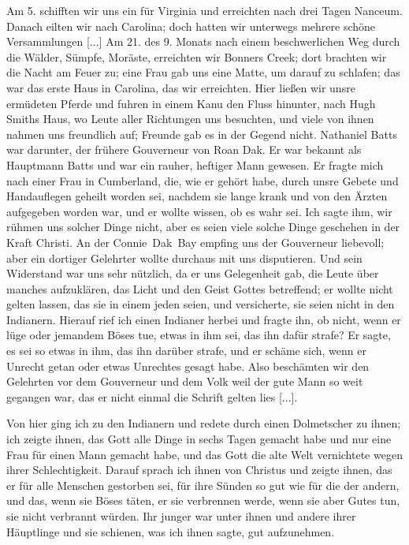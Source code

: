 Am 5. schifften wir uns ein für Virginia und erreichten nach
drei Tagen Nanceum. Danach eilten wir 
nach Carolina; doch
hatten wir unterwegs mehrere schöne Versammlungen [...] Am
21. des 9. Monats nach einem beschwerlichen Weg durch die
Wälder, Sümpfe, Moräste, erreichten wir 
Bonners Creek; dort
brachten wir die Nacht am Feuer zu; eine Frau gab uns eine
Matte, um darauf zu schlafen; das war das erste Haus in 
Carolina, das wir erreichten.
Hier ließen wir unsre ermüdeten Pferde und fuhren in einem
Kanu den Fluss hinunter, nach Hugh 
Smiths Haus, wo Leute
aller Richtungen uns besuchten, und viele von ihnen nahmen uns
freundlich auf; Freunde gab es in der Gegend nicht. Nathaniel
Batts war darunter, der frühere Gouverneur von Roan Dak. Er
war bekannt als Hauptmann Batts 
und war ein rauher, heftiger
Mann gewesen. Er fragte mich nach einer Frau in Cumberland,
die, wie er gehört habe, durch unsre Gebete und Handauflegen
geheilt worden sei, nachdem sie lange krank und von den Ärzten
aufgegeben worden war, und er wollte wissen, ob es wahr sei.
Ich sagte ihm, wir rühmen uns solcher Dinge nicht, aber es seien
viele solche Dinge geschehen in der Kraft Christi. An der 
Connie~Dak~Bay empfing uns der Gouverneur 
liebevoll; aber ein dortiger
Gelehrter wollte durchaus mit uns disputieren. Und sein Widerstand 
war uns sehr nützlich, da er uns Gelegenheit gab, die Leute
über manches aufzuklären, das Licht und den Geist Gottes betreffend;
er wollte nicht gelten lassen, das sie in einem jeden seien, und 
versicherte, sie seien nicht in den Indianern. 
Hierauf rief ich einen
Indianer herbei und fragte ihn, ob nicht, wenn er lüge oder
jemandem Böses tue, etwas in ihm sei, das ihn dafür strafe? Er
sagte, es sei so etwas in ihm, das ihn darüber strafe, und er
schäme sich, wenn er Unrecht getan oder etwas Unrechtes gesagt
habe. Also beschämten wir den Gelehrten vor dem Gouverneur
und dem Volk weil der gute Mann so weit gegangen war, das er
nicht einmal die Schrift gelten lies [...].

Von hier ging ich zu den Indianern und redete durch einen
Dolmetscher zu ihnen; ich zeigte ihnen, das Gott alle Dinge in
sechs Tagen gemacht habe und nur eine Frau für einen Mann
gemacht habe, und das Gott die alte Welt vernichtete wegen ihrer
Schlechtigkeit. Darauf sprach ich ihnen von Christus und zeigte
ihnen, das er für alle Menschen gestorben sei, für ihre Sünden
so gut wie für die der andern, und das, wenn sie Böses täten, er sie
verbrennen werde, wenn sie aber Gutes tun, sie nicht verbrannt
würden. Ihr junger  war unter ihnen und andere ihrer
Häuptlinge und sie schienen, was ich ihnen sagte, gut aufzunehmen.

